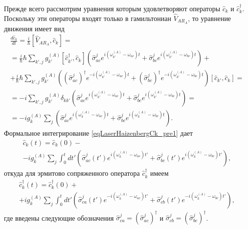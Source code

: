 Прежде всего рассмотрим уравнения которым удовлетворяют операторы
$\hat{c}_k$ и $\hat{c}_k^{\dag}$. Поскольку эти операторы входят только в
гамильтониан $\hat{V}_{AR_A}$, то уравнение движения имеет вид
\begin{eqnarray}
\frac{d \hat{c}_k}{d t} = \frac{i}{\hbar}\left[\hat{V}_{AR_A}, \hat{c}_k
\right] = 
\nonumber \\
= \frac{i}{\hbar} \hbar 
\sum_{k',j} 
g_{k'}^{(A)}\left[\hat{c}_{k'}^{\dag}, \hat{c}_k\right]
\left(
\hat{\sigma}_{ac}^{j} e^{i\left(\omega_{k'}^{(A)} - \omega_{ac}\right)t}
+
\hat{\sigma}_{bc}^{j} e^{i\left(\omega_{k'}^{(A)} - \omega_{bc}\right)t}
\right) +
\nonumber \\
+
\frac{i}{\hbar} \hbar 
\sum_{k',j} 
g_{k'}^{(A)}
\left(
\left(\hat{\sigma}_{ac}^{j}\right)^{\dag} e^{- i\left(\omega_{k'}^{(A)} - \omega_{ac}\right)t}
+
\left(\hat{\sigma}_{bc}^{j}\right)^{\dag} e^{- i\left(\omega_{k'}^{(A)} - \omega_{bc}\right)t}
\right)
\left[\hat{c}_{k'}, \hat{c}_k\right] =
\nonumber \\
= 
 - i 
\sum_{k',j} 
g_{k'}^{(A)}\delta_{kk'}
\left(
\hat{\sigma}_{ac}^{j} e^{i\left(\omega_{k'}^{(A)} - \omega_{ac}\right)t}
+
\hat{\sigma}_{bc}^{j} e^{i\left(\omega_{k'}^{(A)} - \omega_{bc}\right)t}
\right) = 
\nonumber \\
=
 - i g_{k}^{(A)}
\sum_{j} 
\left(
\hat{\sigma}_{ac}^{j} e^{i\left(\omega_{k}^{(A)} - \omega_{ac}\right)t}
+
\hat{\sigma}_{bc}^{j} e^{i\left(\omega_{k}^{(A)} - \omega_{bc}\right)t}
\right).
\label{eqLaserHaizenbergCk_pre1}
\end{eqnarray} 
Формальное интегрирование \eqref{eqLaserHaizenbergCk_pre1} дает
\begin{eqnarray}
\hat{c}_k\left(t\right) = \hat{c}_k\left(0\right) -
\nonumber \\
 - i g_{k}^{(A)}
\sum_{j} 
\int_0^t d t'
\left(
\hat{\sigma}_{ac}^{j}\left(t'\right) e^{i\left(\omega_{k}^{(A)} - \omega_{ac}\right)t'}
+
\hat{\sigma}_{bc}^{j}\left(t'\right) e^{i\left(\omega_{k}^{(A)} - \omega_{bc}\right)t'}
\right),
\label{eqLaserHaizenbergCk}
\end{eqnarray}
откуда для эрмитово сопряженного оператора $\hat{c}_k^{\dag}$ имеем
\begin{eqnarray}
\hat{c}_k^{\dag}\left(t\right) = \hat{c}_k^{\dag}\left(0\right) +
\nonumber \\
 + i g_{k}^{(A)}
\sum_{j} 
\int_0^t d t'
\left(
\hat{\sigma}_{ca}^{j}\left(t'\right) e^{-i\left(\omega_{k}^{(A)} - \omega_{ac}\right)t'}
+
\hat{\sigma}_{cb}^{j}\left(t'\right) e^{-i\left(\omega_{k}^{(A)} - \omega_{bc}\right)t'}
\right),
\label{eqLaserHaizenbergCkPlus}
\end{eqnarray}
где введены следующие обозначения $\hat{\sigma}_{ca}^{j} =
\left(\hat{\sigma}_{ac}^{j}\right)^{\dag}$ и
$\hat{\sigma}_{cb}^{j} = \left(\hat{\sigma}_{bc}^{j}\right)^{\dag}$.

